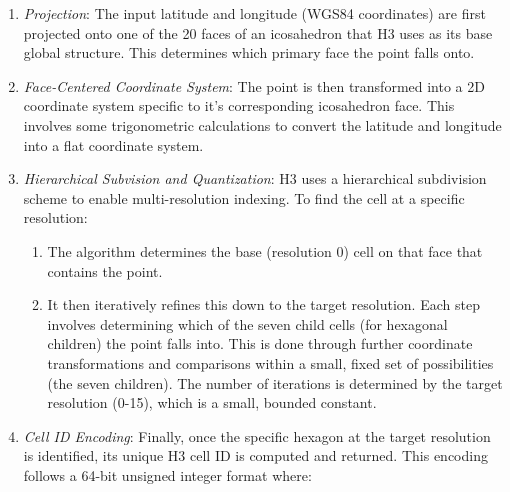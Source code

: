 \begin{enumerate}
    \item \textit{Projection}: The input latitude and longitude (WGS84 coordinates) are first projected onto one of the 20 faces of an icosahedron that H3 uses as its base global structure. This determines which primary face the point falls onto.
    \item \textit{Face-Centered Coordinate System}: The point is then transformed into a 2D coordinate system specific to it's corresponding icosahedron face. 
    This involves some trigonometric calculations to convert the latitude and longitude into a flat coordinate system.
    \item \textit{Hierarchical Subvision and Quantization}: H3 uses a hierarchical subdivision scheme to enable multi-resolution indexing. To find the cell at a specific resolution:
    \begin{enumerate}
        \item The algorithm determines the base (resolution 0) cell on that face that contains the point.
        \item It then iteratively refines this down to the target resolution. Each step involves determining which of the seven child cells (for hexagonal children) the point falls into. 
        This is done through further coordinate transformations and comparisons within a small, fixed set of possibilities (the seven children). 
        The number of iterations is determined by the target resolution (0-15), which is a small, bounded constant.
    \end{enumerate}
    \item \textit{Cell ID Encoding}: Finally, once the specific hexagon at the target resolution is identified, its unique H3 cell ID is computed and returned. This encoding follows a 64-bit unsigned integer format where:
\end{enumerate}

